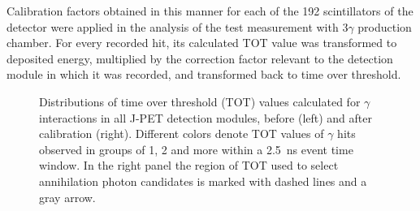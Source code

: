 Calibration factors obtained in this manner for each of the 192 scintillators of the detector were applied in the analysis of the test measurement with 3$\gamma$ production chamber. For every recorded hit, its calculated TOT value was transformed to deposited energy, multiplied by the correction factor relevant to the detection module in which it was recorded, and transformed back to time over threshold.
\begin{figure}[h!]
  \centering
  \hspace{1em}
  \caption{Distributions of time over threshold (TOT) values calculated for $\gamma$ interactions in all J-PET detection modules, before (left) and after calibration (right). Different colors denote TOT values of $\gamma$ hits observed in groups of 1, 2 and more within a 2.5~ns event time window. In the right panel the region of TOT used to select annihilation photon candidates is marked with dashed lines and a gray arrow.}\label{fig:tot_calib}
\end{figure}

